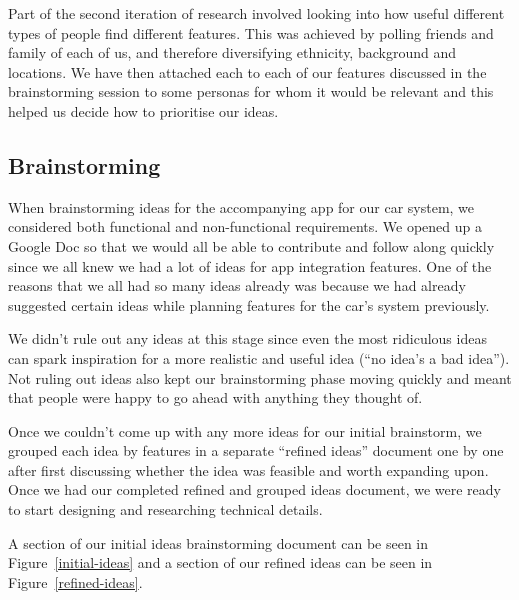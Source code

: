 \documentclass{article}
\begin{document}
Part of the second iteration of research involved looking into how useful different types of people find different features. This was achieved by polling friends and family of each of us, and therefore diversifying ethnicity, background and locations. We have then attached each to each of our features discussed in the brainstorming session to some personas for whom it would be relevant and this helped us decide how to prioritise our ideas.

\subsection{Brainstorming}\label{ssec:app-brainstorming} %
When brainstorming ideas for the accompanying app for our car system, we considered both functional and non-functional requirements. We opened up a Google Doc so that we would all be able to contribute and follow along quickly since we all knew we had a lot of ideas for app integration features. One of the reasons that we all had so many ideas already was because we had already suggested certain ideas while planning features for the car's system previously.

We didn't rule out any ideas at this stage since even the most ridiculous ideas can spark inspiration for a more realistic and useful idea (``no idea's a bad idea''). Not ruling out ideas also kept our brainstorming phase moving quickly and meant that people were happy to go ahead with anything they thought of.

Once we couldn't come up with any more ideas for our initial brainstorm, we grouped each idea by features in a separate ``refined ideas'' document one by one after first discussing whether the idea was feasible and worth expanding upon. Once we had our completed refined and grouped ideas document, we were ready to start designing and researching technical details.

A section of our initial ideas brainstorming document can be seen in Figure~\ref{initial-ideas} and a section of our refined ideas can be seen in Figure~\ref{refined-ideas}.
\end{document}
